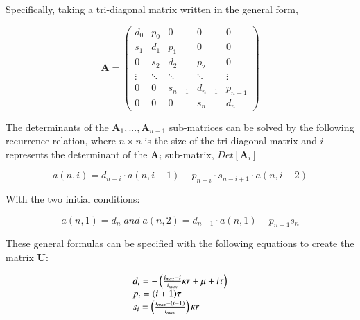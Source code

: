 \documentclass[review]{elsarticle}
\let\bs\boldsymbol
\begin{document}
Specifically, taking a tri-diagonal matrix written in the general form,

\[\bs{A}=
\left(\begin{array}{ccccc}
d_{0} & p_{0} & 0 & 0 & 0\\
s_{1} & d_{1} & p_{1} & 0 & 0\\
0 & s_{2} & d_{2} & p_{2} & 0\\
\vdots & \ddots & \ddots & \ddots & \vdots\\
0 & 0 & s_{n-1} & d_{n-1} & p_{n-1}\\
0 & 0 & 0 & s_{n} & d_{n}
\end{array}\right)
\]

The determinants of the $\bs{A}_{1},...,\bs{A}_{n-1}$ sub-matrices can
be solved by the following recurrence relation, where $n\times n$ is the	
size of the tri-diagonal matrix and $i$ represents the determinant
of the $\bs{A}_{i}$ sub-matrix, $Det[\bs{A}_{i}]$

\[
a(n,i)=d_{n-i}\cdot a(n,i-1)-p_{n-i}\cdot s_{n-i+1}\cdot a(n,i-2)
\]


With the two initial conditions:

\[
a(n,1)=d_{n}\; and\; a(n,2)=d_{n-1}\cdot a(n,1)-p_{n-1}s_{n}
\]


These general formulas can be specified with the following equations to create the matrix $\bs{U}$:

\[
\begin{array}{l}
d_{i}=-\left(\frac{i_{max}-i}{i_{max}}\kappa r+\mu+i\text{\ensuremath{\tau}}\right)\\
p_{i}=(i+1)\tau\\
s_{i}=\left(\frac{i_{max}-(i-1)}{i_{max}}\right)\kappa r
\end{array}
\]
\end{document}
